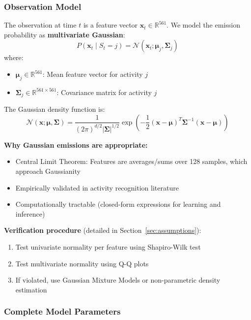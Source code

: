 \documentclass[11pt,a4paper]{article}
\newcommand{\R}{\mathbb{R}}
\newcommand{\bx}{\mathbf{x}}
\newcommand{\bmu}{\boldsymbol{\mu}}
\newcommand{\bSigma}{\boldsymbol{\Sigma}}
\begin{document}
\subsubsection{Observation Model}

The observation at time $t$ is a feature vector $\bx_t \in \R^{561}$. We model the emission probability as \textbf{multivariate Gaussian}:
\begin{equation}
P(\bx_t \mid S_t = j) = \mathcal{N}(\bx_t; \bmu_j, \bSigma_j)
\end{equation}
where:
\begin{itemize}[leftmargin=*]
    \item $\bmu_j \in \R^{561}$: Mean feature vector for activity $j$
    \item $\bSigma_j \in \R^{561 \times 561}$: Covariance matrix for activity $j$
\end{itemize}

The Gaussian density function is:
\begin{equation}
\mathcal{N}(\bx; \bmu, \bSigma) = \frac{1}{(2\pi)^{d/2}|\bSigma|^{1/2}} \exp\left(-\frac{1}{2}(\bx-\bmu)^T\bSigma^{-1}(\bx-\bmu)\right)
\end{equation}

\textbf{Why Gaussian emissions are appropriate:}
\begin{itemize}[leftmargin=*]
    \item Central Limit Theorem: Features are averages/sums over 128 samples, which approach Gaussianity
    \item Empirically validated in activity recognition literature
    \item Computationally tractable (closed-form expressions for learning and inference)
\end{itemize}

\textbf{Verification procedure} (detailed in Section~\ref{sec:assumptions}):
\begin{enumerate}
    \item Test univariate normality per feature using Shapiro-Wilk test
    \item Test multivariate normality using Q-Q plots
    \item If violated, use Gaussian Mixture Models or non-parametric density estimation
\end{enumerate}

\subsubsection{Complete Model Parameters}
\end{document}
